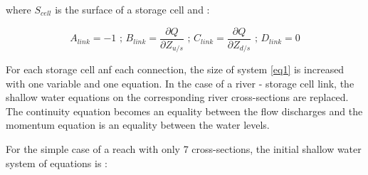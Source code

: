 where $S_{cell}$ is the surface of a storage cell and :

\begin{equation*}
 A_{link} = -1 \mbox{ ; } B_{link} = \frac{\partial Q}{\partial Z_{u/s}} \mbox{ ; }  C_{link} = \frac{\partial Q}{\partial Z_{d/s}} \mbox{ ; } D_{link} = 0
\end{equation*}

For each storage cell anf each connection, the size of system \ref{eq1} is increased with one variable and one equation. In the case of a river - storage cell link, the shallow water equations on the corresponding river cross-sections are replaced.
The continuity equation becomes an equality between the flow discharges and the momentum equation is an equality between the water levels.

For the simple case of a reach with only 7 cross-sections, the initial shallow water system of equations is :

